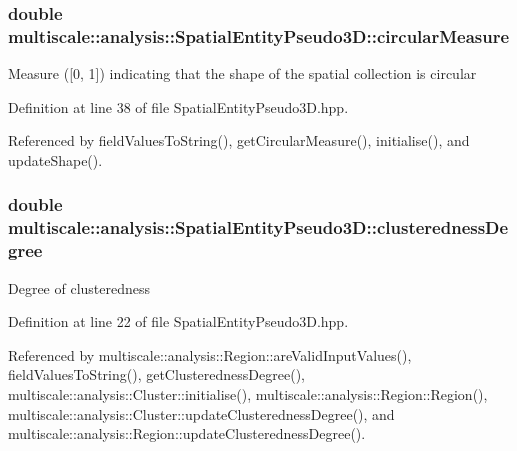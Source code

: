 \hypertarget{classmultiscale_1_1analysis_1_1SpatialEntityPseudo3D_aa4ac170fb21e9697358d47ba6ea7a267}{
\subsubsection[{circular\-Measure}]{\setlength{\rightskip}{0pt plus 5cm}double multiscale\-::analysis\-::\-Spatial\-Entity\-Pseudo3\-D\-::circular\-Measure\hspace{0.3cm}{\ttfamily [protected]}}}\label{classmultiscale_1_1analysis_1_1SpatialEntityPseudo3D_aa4ac170fb21e9697358d47ba6ea7a267}
Measure (\mbox{[}0, 1\mbox{]}) indicating that the shape of the spatial collection is circular 

Definition at line 38 of file Spatial\-Entity\-Pseudo3\-D.\-hpp.



Referenced by field\-Values\-To\-String(), get\-Circular\-Measure(), initialise(), and update\-Shape().

\hypertarget{classmultiscale_1_1analysis_1_1SpatialEntityPseudo3D_a22a84312e7c497cc5fbc4d8b41d8fd45}{
\subsubsection[{clusteredness\-Degree}]{\setlength{\rightskip}{0pt plus 5cm}double multiscale\-::analysis\-::\-Spatial\-Entity\-Pseudo3\-D\-::clusteredness\-Degree\hspace{0.3cm}{\ttfamily [protected]}}}\label{classmultiscale_1_1analysis_1_1SpatialEntityPseudo3D_a22a84312e7c497cc5fbc4d8b41d8fd45}
Degree of clusteredness 

Definition at line 22 of file Spatial\-Entity\-Pseudo3\-D.\-hpp.



Referenced by multiscale\-::analysis\-::\-Region\-::are\-Valid\-Input\-Values(), field\-Values\-To\-String(), get\-Clusteredness\-Degree(), multiscale\-::analysis\-::\-Cluster\-::initialise(), multiscale\-::analysis\-::\-Region\-::\-Region(), multiscale\-::analysis\-::\-Cluster\-::update\-Clusteredness\-Degree(), and multiscale\-::analysis\-::\-Region\-::update\-Clusteredness\-Degree().

